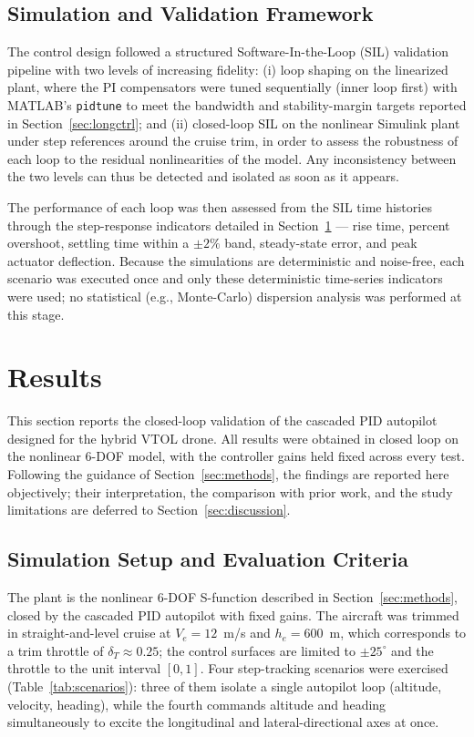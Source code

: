 \documentclass{ieeeaccess}
\begin{document}
\subsection{Simulation and Validation Framework}

The control design followed a structured Software-In-the-Loop (SIL) validation pipeline with two levels of increasing fidelity: (i) loop shaping on the linearized plant, where the PI compensators were tuned sequentially (inner loop first) with MATLAB's \texttt{pidtune} to meet the bandwidth and stability-margin targets reported in Section~\ref{sec:longctrl}; and (ii) closed-loop SIL on the nonlinear Simulink plant under step references around the cruise trim, in order to assess the robustness of each loop to the residual nonlinearities of the model. Any inconsistency between the two levels can thus be detected and isolated as soon as it appears.

The performance of each loop was then assessed from the SIL time histories through the step-response indicators detailed in Section~\ref{sec:results} --- rise time, percent overshoot, settling time within a $\pm 2\%$ band, steady-state error, and peak actuator deflection. Because the simulations are deterministic and noise-free, each scenario was executed once and only these deterministic time-series indicators were used; no statistical (e.g., Monte-Carlo) dispersion analysis was performed at this stage.

\section{Results}
\label{sec:results}

This section reports the closed-loop validation of the cascaded PID autopilot designed for the hybrid VTOL drone. All results were obtained in closed loop on the nonlinear 6-DOF model, with the controller gains held fixed across every test. Following the guidance of Section~\ref{sec:methods}, the findings are reported here objectively; their interpretation, the comparison with prior work, and the study limitations are deferred to Section~\ref{sec:discussion}.

\subsection{Simulation Setup and Evaluation Criteria}

The plant is the nonlinear 6-DOF S-function described in Section~\ref{sec:methods}, closed by the cascaded PID autopilot with fixed gains. The aircraft was trimmed in straight-and-level cruise at $V_e = 12$~m/s and $h_e = 600$~m, which corresponds to a trim throttle of $\delta_T \approx 0.25$; the control surfaces are limited to $\pm 25^\circ$ and the throttle to the unit interval $[0,1]$. Four step-tracking scenarios were exercised (Table~\ref{tab:scenarios}): three of them isolate a single autopilot loop (altitude, velocity, heading), while the fourth commands altitude and heading simultaneously to excite the longitudinal and lateral-directional axes at once.
\end{document}
